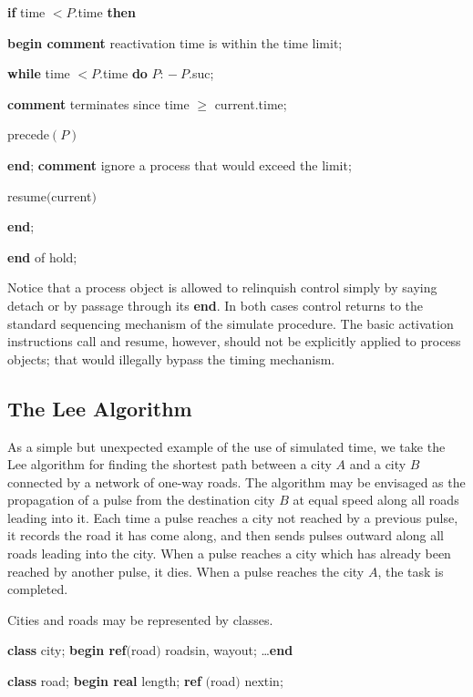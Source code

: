 \documentclass[twoside,11pt]{book}
\begin{document}
\quad \quad \quad \quad \textbf{if} time $< P$.time \textbf{then}

\quad \quad \quad \quad \quad \textbf{begin comment} reactivation time is within the time limit;

\quad \quad \quad \quad \quad \quad \textbf{while} time $< P$.time \textbf{do} $P$: $-\ P$.suc;

\quad \quad \quad \quad \quad \quad \textbf{comment} terminates since time $\geqslant$ current.time;

\quad \quad \quad \quad \quad \quad precede$(P)$

\quad \quad \quad \quad \quad \textbf{end}; \textbf{comment} ignore a process that would exceed the limit;

\quad \quad \quad \quad resume$($current$)$

\quad \quad \textbf{end};

\quad \textbf{end} of hold;

\noindent
Notice that a process object is allowed to relinquish control simply by saying detach or by passage through its \textbf{end}. In both cases control returns to the standard sequencing mechanism of the simulate procedure. The basic activation instructions call and resume, however, should not be explicitly applied to process objects; that would illegally bypass the timing mechanism.

\subsection{The Lee Algorithm}

As a simple but unexpected example of the use of simulated time, we take the Lee algorithm for finding the shortest path between a city $A$ and a city $B$ connected by a network of one-way roads. The algorithm may be envisaged as the propagation of a pulse from the destination city $B$ at equal speed along all roads leading into it. Each time a pulse reaches a city not reached by a previous pulse, it records the road it has come along, and then sends pulses outward along all roads leading into the city. When a pulse reaches a city which has already been reached by another pulse, it dies. When a pulse reaches the city $A$, the task is completed.

Cities and roads may be represented by classes.

\quad \textbf{class} city; \textbf{begin ref}$($road$)$ roadsin, wayout; \dots \textbf{end}

\quad \textbf{class} road; \textbf{begin real} length; \textbf{ref} $($road$)$ nextin;
\end{document}
